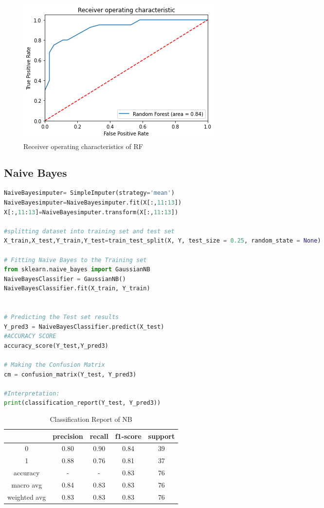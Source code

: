 \begin{figure}[H]
    \centering
    \includegraphics[width=0.5\linewidth]{RF.png}
    \caption{Receiver operating characteristics of RF}
    \label{fig:enter-label}
\end{figure}

\subsection{Naive Bayes}
\begin{lstlisting}[language=Python, label=list:python_code_ex]
NaiveBayesimputer= SimpleImputer(strategy='mean')
NaiveBayesimputer=NaiveBayesimputer.fit(X[:,11:13])
X[:,11:13]=NaiveBayesimputer.transform(X[:,11:13])

#splitting dataset into training set and test set
X_train,X_test,Y_train,Y_test=train_test_split(X, Y, test_size = 0.25, random_state = None)

# Fitting Naive Bayes to the Training set
from sklearn.naive_bayes import GaussianNB
NaiveBayesClassifier = GaussianNB()
NaiveBayesClassifier.fit(X_train, Y_train)


# Predicting the Test set results
Y_pred3 = NaiveBayesClassifier.predict(X_test)
#ACCURACY SCORE
accuracy_score(Y_test,Y_pred3)

# Making the Confusion Matrix
cm = confusion_matrix(Y_test, Y_pred3)

#Interpretation:
print(classification_report(Y_test, Y_pred3))
\end{lstlisting}

\begin{table}[h!]
    \centering
    \caption{Classification Report of NB}
    \label{tab:_ex_tab}
    \begin{tabular}{ccccc}     
        \toprule
            &  precision & recall & f1-score & support \\
        \midrule
        0 & 0.80 & 0.90 & 0.84 & 39 \\
        1 & 0.88 & 0.76 & 0.81 & 37 \\

        accuracy & - & - & 0.83 & 76 \\
        macro avg & 0.84 & 0.83 & 0.83 & 76 \\
        weighted avg & 0.83 & 0.83 & 0.83 & 76 \\
        \bottomrule
    \end{tabular}
\end{table}


